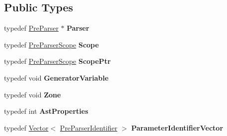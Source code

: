 \subsection*{Public Types}
\begin{DoxyCompactItemize}
\item 
\hypertarget{structv8_1_1internal_1_1_pre_parser_traits_1_1_type_a2ef3e48d99f0d01c4e680be56164cfea}{}typedef \hyperlink{classv8_1_1internal_1_1_pre_parser}{Pre\+Parser} $\ast$ {\bfseries Parser}\label{structv8_1_1internal_1_1_pre_parser_traits_1_1_type_a2ef3e48d99f0d01c4e680be56164cfea}

\item 
\hypertarget{structv8_1_1internal_1_1_pre_parser_traits_1_1_type_a5065e640db7b65889c8eac0ee5e83e48}{}typedef \hyperlink{classv8_1_1internal_1_1_pre_parser_scope}{Pre\+Parser\+Scope} {\bfseries Scope}\label{structv8_1_1internal_1_1_pre_parser_traits_1_1_type_a5065e640db7b65889c8eac0ee5e83e48}

\item 
\hypertarget{structv8_1_1internal_1_1_pre_parser_traits_1_1_type_ab2cc9e8dcf518862be7dae233a80e41f}{}typedef \hyperlink{classv8_1_1internal_1_1_pre_parser_scope}{Pre\+Parser\+Scope} {\bfseries Scope\+Ptr}\label{structv8_1_1internal_1_1_pre_parser_traits_1_1_type_ab2cc9e8dcf518862be7dae233a80e41f}

\item 
\hypertarget{structv8_1_1internal_1_1_pre_parser_traits_1_1_type_afb23ca9cefc60e38846e15de184d5f47}{}typedef void {\bfseries Generator\+Variable}\label{structv8_1_1internal_1_1_pre_parser_traits_1_1_type_afb23ca9cefc60e38846e15de184d5f47}

\item 
\hypertarget{structv8_1_1internal_1_1_pre_parser_traits_1_1_type_a5025c3852c2e3de021fa4871499fe7b3}{}typedef void {\bfseries Zone}\label{structv8_1_1internal_1_1_pre_parser_traits_1_1_type_a5025c3852c2e3de021fa4871499fe7b3}

\item 
\hypertarget{structv8_1_1internal_1_1_pre_parser_traits_1_1_type_a1f4f085fcded5b7a5463e24f416e2515}{}typedef int {\bfseries Ast\+Properties}\label{structv8_1_1internal_1_1_pre_parser_traits_1_1_type_a1f4f085fcded5b7a5463e24f416e2515}

\item 
\hypertarget{structv8_1_1internal_1_1_pre_parser_traits_1_1_type_a2b79fe879cc74c4ef7928b259d0fa226}{}typedef \hyperlink{classv8_1_1internal_1_1_vector}{Vector}$<$ \hyperlink{classv8_1_1internal_1_1_pre_parser_identifier}{Pre\+Parser\+Identifier} $>$ {\bfseries Parameter\+Identifier\+Vector}\label{structv8_1_1internal_1_1_pre_parser_traits_1_1_type_a2b79fe879cc74c4ef7928b259d0fa226}


\end{DoxyCompactItemize}
